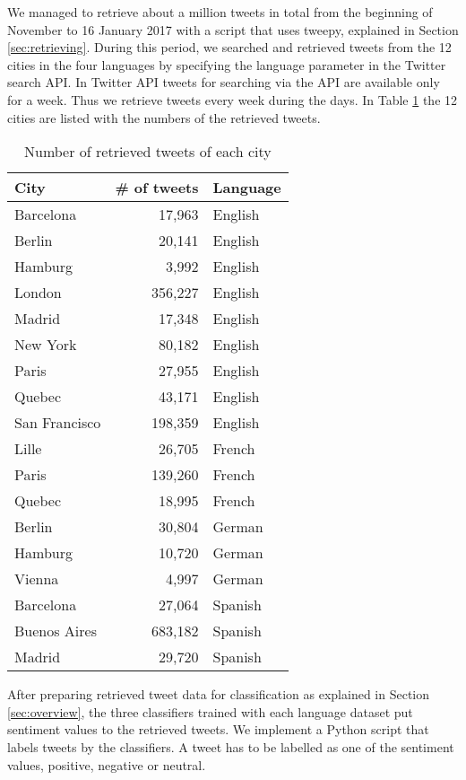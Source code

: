 We managed to retrieve about a million tweets in total from the beginning of November to 16 January 2017 with a script that uses tweepy, explained in Section \ref{sec:retrieving}.
During this period, we searched and retrieved tweets from the 12 cities in the four languages by specifying the language parameter in the Twitter search API.
In Twitter API tweets for searching via the API are available only for a week.
Thus we retrieve tweets every week during the days.
In Table \ref{tab:cities} the 12 cities are listed with the numbers of the retrieved tweets.

\begin{table}[ht]
	\caption{Number of retrieved tweets of each city}
	\centering
	\begin{tabular}{|l|r|l|} \hline
	City&\# of tweets&Language\\ \hline \hline
	Barcelona & 17,963 & English \\ \hline
	Berlin & 20,141 & English\\ \hline
	Hamburg & 3,992 & English\\ \hline
	London  & 356,227& English\\ \hline
	Madrid & 17,348 & English \\ \hline
	New York  & 80,182  & English\\ \hline
	Paris & 27,955 & English \\ \hline
	Quebec & 43,171 & English \\ \hline
	San Francisco & 198,359  & English\\ \hline
	Lille & 26,705  & French\\ \hline
	Paris & 139,260 & French\\ \hline
	Quebec & 18,995 & French\\ \hline
	Berlin & 30,804 & German\\ \hline
	Hamburg & 10,720 & German\\ \hline
	Vienna & 4,997  & German\\ \hline
	Barcelona&27,064 & Spanish\\ \hline
	Buenos Aires&683,182  & Spanish\\ \hline
	Madrid& 29,720 & Spanish\\ \hline
	\end{tabular}
	\label{tab:cities}
\end{table}

After preparing retrieved tweet data for classification as explained in Section \ref{sec:overview}, the three classifiers trained with each language dataset put sentiment values to the retrieved tweets.
We implement a Python script that labels tweets by the classifiers.
A tweet has to be labelled as one of the sentiment values, positive, negative or neutral.

